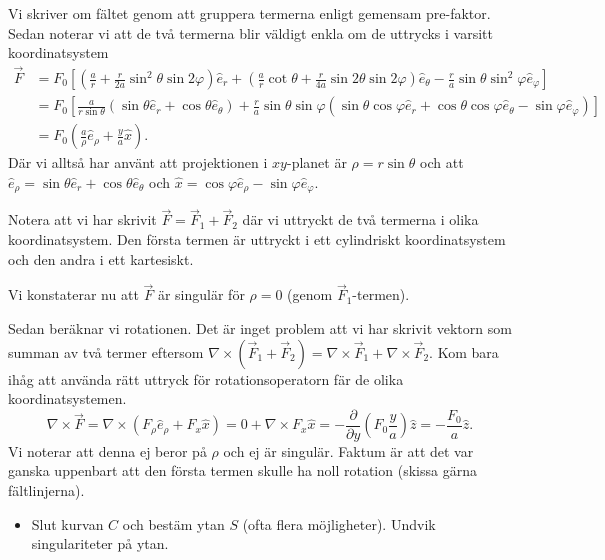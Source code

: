 \documentclass[%
oneside,                 %
final,                   %
10pt]{article}
\begin{document}
\noindent
Vi skriver om fältet genom att gruppera termerna enligt gemensam pre-faktor. Sedan noterar vi att de två termerna blir väldigt enkla om de uttrycks i varsitt koordinatsystem
\begin{align}
  \vec{F} &= F_0 \left[\left(\frac{a}{r} + \frac{r}{2a} \sin^2 \theta 
\sin 2\varphi\right) \hat{e}_r + \left(\frac{a}{r} \cot \theta + 
\frac{r}{4a} \sin 2\theta \sin 2\varphi\right) \hat{e}_\theta -
\frac{r}{a} \sin \theta \sin^2 \varphi \hat{e}_\varphi \right]
\nonumber \\
&= F_0 \left[\frac{a}{r\sin \theta} \left(\sin \theta \hat{e}_r + 
\cos \theta \hat{e}_\theta \right) + \frac{r}{a} \sin \theta \sin \varphi
\left( \sin \theta \cos \varphi \hat{e}_r + \cos \theta \cos \varphi 
\hat{e}_\theta - \sin \varphi \hat{e}_\varphi \right) \right]
\nonumber \\
&= F_0 \left(\frac{a}{\rho} \hat{e}_\rho + \frac{y}{a} \hat{x} \right).
\end{align}
Där vi alltså har använt att projektionen i $xy$-planet är $\rho = r \sin\theta$ och att $\hat{e}_\rho = \sin\theta \hat{e}_r + \cos\theta \hat{e}_\theta$ och $\hat{x} = \cos\varphi \hat{e}_\rho - \sin\varphi \hat{e}_\varphi$.

Notera att vi har skrivit $\vec{F} = \vec{F}_1 + \vec{F}_2$ där vi uttryckt de två termerna i olika koordinatsystem. Den första termen är uttryckt i ett cylindriskt koordinatsystem och den andra i ett kartesiskt.

Vi konstaterar nu att $\vec{F}$ är singulär för $\rho = 0$ (genom $\vec{F}_1$-termen).

Sedan beräknar vi rotationen. Det är inget problem att vi har skrivit vektorn som summan av två termer eftersom $\nabla \times (\vec{F}_1 + \vec{F}_2) = \nabla \times \vec{F}_1 + \nabla \times \vec{F}_2$. Kom bara ihåg att använda rätt uttryck för rotationsoperatorn fär de olika koordinatsystemen.
\begin{equation}
  \nabla \times \vec{F} = \nabla \times \left( F_\rho \hat{e}_\rho + F_x \hat{x} \right) = 0 + \nabla \times F_x \hat{x} = - \frac{\partial}{\partial y}\left(F_0\frac{y}{a}\right) 
\hat{z} = - \frac{F_0}{a} \hat{z}.
\end{equation}
Vi noterar att denna ej beror på $\rho$ och ej är singulär. Faktum är att det var ganska uppenbart att den första termen skulle ha noll rotation (skissa gärna fältlinjerna).

\begin{itemize}
\item Slut kurvan $C$ och bestäm ytan $S$ (ofta flera möjligheter). Undvik singulariteter på ytan.
\end{itemize}
\end{document}
